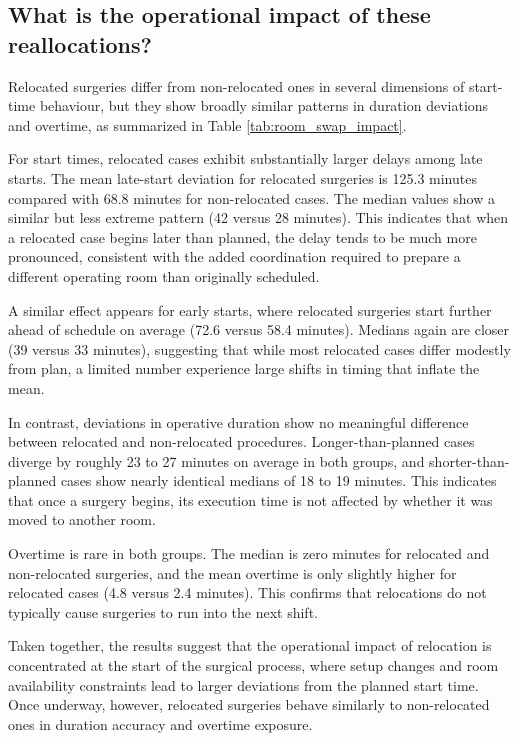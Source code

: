 \documentclass[
]{article}
\begin{document}
\subsection{What is the operational impact of these
reallocations?}\label{what-is-the-operational-impact-of-these-reallocations}

Relocated surgeries differ from non-relocated ones in several dimensions
of start-time behaviour, but they show broadly similar patterns in
duration deviations and overtime, as summarized in Table
\ref{tab:room_swap_impact}.

For start times, relocated cases exhibit substantially larger delays
among late starts. The mean late-start deviation for relocated surgeries
is 125.3 minutes compared with 68.8 minutes for non-relocated cases. The
median values show a similar but less extreme pattern (42 versus 28
minutes). This indicates that when a relocated case begins later than
planned, the delay tends to be much more pronounced, consistent with the
added coordination required to prepare a different operating room than
originally scheduled.

A similar effect appears for early starts, where relocated surgeries
start further ahead of schedule on average (72.6 versus 58.4 minutes).
Medians again are closer (39 versus 33 minutes), suggesting that while
most relocated cases differ modestly from plan, a limited number
experience large shifts in timing that inflate the mean.

In contrast, deviations in operative duration show no meaningful
difference between relocated and non-relocated procedures.
Longer-than-planned cases diverge by roughly 23 to 27 minutes on average
in both groups, and shorter-than-planned cases show nearly identical
medians of 18 to 19 minutes. This indicates that once a surgery begins,
its execution time is not affected by whether it was moved to another
room.

Overtime is rare in both groups. The median is zero minutes for
relocated and non-relocated surgeries, and the mean overtime is only
slightly higher for relocated cases (4.8 versus 2.4 minutes). This
confirms that relocations do not typically cause surgeries to run into
the next shift.

Taken together, the results suggest that the operational impact of
relocation is concentrated at the start of the surgical process, where
setup changes and room availability constraints lead to larger
deviations from the planned start time. Once underway, however,
relocated surgeries behave similarly to non-relocated ones in duration
accuracy and overtime exposure.
\end{document}
